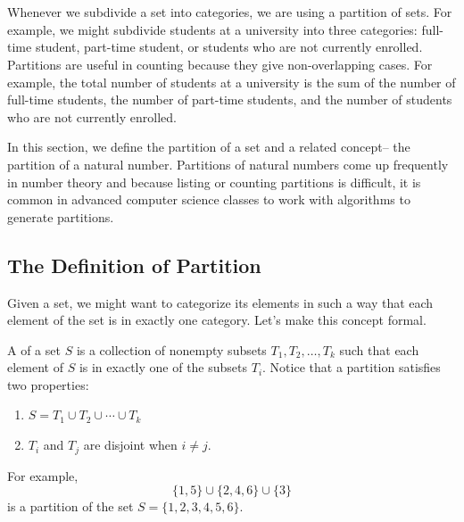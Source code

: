 \section{\secpartitions}
\label{sec_partitions}

Whenever we subdivide a set into categories, we are using a partition of sets.  For example, we might subdivide students at a university into three categories: full-time student, part-time student, or students who are not currently enrolled.  Partitions are useful in counting because they give non-overlapping cases.  For example, the total number of students at a university is the sum of the number of full-time students, the number of part-time students, and the number of students who are not currently enrolled.

In this section, we define the partition of a set and a related concept-- the partition of a natural number.  Partitions of natural numbers come up frequently in number theory and because listing or counting partitions is difficult, it is common in advanced computer science classes to work with algorithms to generate partitions.


\newcommand{\subdefnpartition}{The Definition of Partition}
\subsection{\subdefnpartition}
\label{sub_defn_partition}

Given a set, we might want to categorize its elements in such a way that each element of the set is in exactly one category. Let's make this concept formal.

\begin{defn}
\label{defn_partition} 
    A  of a set $S$ is a collection of nonempty subsets $T_1, T_2, \ldots, T_k$ such that each element of $S$ is in exactly one of the subsets $T_i$.  Notice that a partition satisfies two properties:
        \begin{enumerate}
            \item $S = T_1 \cup T_2 \cup \cdots \cup T_k$
            \item $T_i$ and $T_j$ are disjoint when $i \neq j$.
        \end{enumerate}  
    For example, 
        $$ \{1,5\} \cup \{2,4,6\} \cup \{3\}$$
    is a partition of the set $S = \{1,2,3,4,5,6\}$.
\end{defn}

